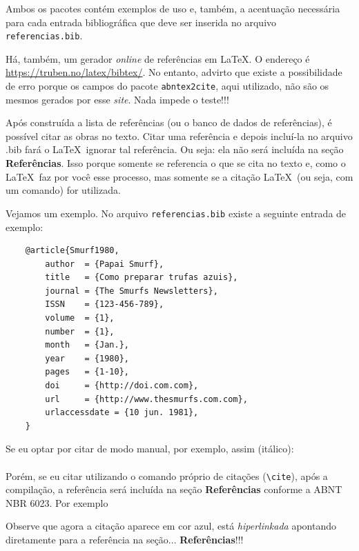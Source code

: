 \documentclass[a4paper,12pt,oneside,openright,extrafontsizes,openbib]{memoir}
\begin{document}
{{Ambos os pacotes contém exemplos de uso e, também, a acentuação necessária para cada entrada bibliográfica que deve ser inserida no arquivo \verb|referencias.bib|.

Há, também, um gerador \textit{online} de referências em \LaTeX. O endereço é \url{https://truben.no/latex/bibtex/}. No entanto, advirto que existe a possibilidade de erro porque os campos do pacote \verb|abntex2cite|, aqui utilizado, não são os mesmos gerados por esse \textit{site}. Nada impede o teste!!!

Após construída a lista de referências (ou o banco de dados de referências), é possível citar as obras no texto. Citar  uma referência e depois incluí-la no arquivo .bib fará o \LaTeX\ ignorar tal referência. Ou seja: ela não será incluída na seção \textbf{Referências}. Isso porque somente se referencia o que se cita no texto e, como o \LaTeX\ faz por você esse processo, mas somente se a citação \LaTeX\ (ou seja, com um comando) for utilizada.

Vejamos um exemplo. No arquivo \verb|referencias.bib| existe a seguinte entrada de exemplo:

\begin{verbatim}
	@article{Smurf1980,
		author  = {Papai Smurf},
		title   = {Como preparar trufas azuis},
		journal = {The Smurfs Newsletters},
		ISSN    = {123-456-789},
		volume  = {1},
		number  = {1},
		month   = {Jan.},
		year    = {1980},
		pages   = {1-10},
		doi     = {http://doi.com.com},
		url     = {http://www.thesmurfs.com.com},
		urlaccessdate = {10 jun. 1981},
	}
\end{verbatim}

Se eu optar por citar de modo manual, por exemplo, assim (itálico): 
\ \\

\ \\

Porém, se eu citar utilizando o comando próprio de citações (\verb|\cite|), após a compilação, a referência será incluída na seção \textbf{Referências} conforme a ABNT NBR 6023. Por exemplo


Observe que agora a citação aparece em cor azul, está \textit{hiperlinkada} apontando diretamente para a referência na seção... \textbf{Referências}!!!

}}
\end{document}
